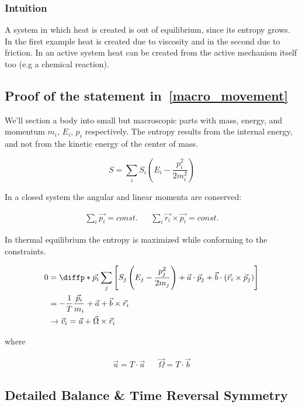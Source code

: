 \subsubsection{Intuition}

A system in which heat is created is out of equilibrium, since its entropy grows. In the first example heat is created due to viscosity and in the second due to friction. In an active system heat can be created from the active mechanism itself too (e.g a chemical reaction).

\subsection{Proof of the statement in~\ref{macro_movement}}

We'll section a body into small but macroscopic parts with mass, energy, and momentum \(m_i\), \(E_i\), \(p_i\) respectively. The entropy results from the internal energy, and not from the kinetic energy of the center of mass.

\begin{equation}
	S = \sum\limits_i S_i(E_i-\frac{p_i^2}{2m_i^2})
\end{equation}

In a closed system the angular and linear momenta are conserved:

\begin{align}
	\sum\limits_i \vec{p_i} = const. && \sum\limits_i \vec{r_i} \times \vec{p_i} = const.
\end{align}

In thermal equilibrium the entropy is maximized while conforming to the constraints.

\begin{align}
	0 &= \diffp*{}{\vec{p_i}}\sum\limits_j \left[S_j\left(E_j-\frac{p_j^2}{2m_j}\right)+\vec a \cdot \vec p_j + \vec b \cdot \left(\vec r_i\times \vec p_j\right)\right]\\
	&= -\frac{1}{T}\frac{\vec p_i}{m_i}+\vec a + \vec b \times \vec r_i\\
	&\rightarrow \vec v_i = \vec u + \vec\Omega \times \vec r_i
\end{align}

where

\begin{align}
	\vec u = T \cdot \vec a && \vec \Omega = T \cdot \vec b
\end{align}

\subsection{Detailed Balance \& Time Reversal Symmetry}

